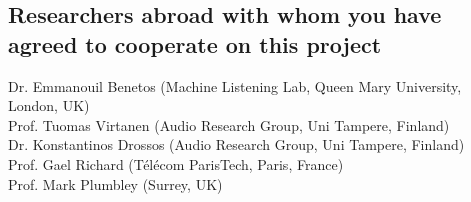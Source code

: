 \documentclass[11pt]{article}
\begin{document}
\subsection{Researchers abroad with whom you have agreed to cooperate on this project}
% 

Dr. Emmanouil Benetos (Machine Listening Lab, Queen Mary University, London, UK) \\ %
Prof. Tuomas Virtanen (Audio Research Group, Uni Tampere, Finland)\\ %
Dr. Konstantinos Drossos (Audio Research Group, Uni Tampere, Finland) \\ %
Prof. Gael Richard (Télécom ParisTech, Paris, France)\\ %
Prof. Mark Plumbley (Surrey, UK) %


\end{document}
